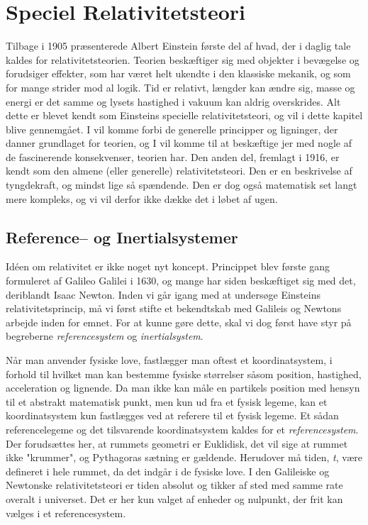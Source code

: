 \chapter{Speciel Relativitetsteori}

Tilbage i 1905 præsenterede Albert Einstein første del af hvad, der i daglig tale kaldes for relativitetsteorien. Teorien beskæftiger sig med objekter i bevægelse og forudsiger effekter, som har været helt ukendte i den klassiske mekanik, og som for mange strider mod al logik. Tid er relativt, længder kan ændre sig, masse og energi er det samme og lysets hastighed i vakuum kan aldrig overskrides. Alt dette er blevet kendt som Einsteins specielle relativitetsteori, og vil i dette kapitel blive gennemgået. I vil komme forbi de generelle principper og ligninger, der danner grundlaget for teorien, og I vil komme til at beskæftige jer med nogle af de fascinerende konsekvenser, teorien har. Den anden del, fremlagt i 1916, er kendt som den almene (eller generelle) relativitetsteori. Den er en beskrivelse af tyngdekraft, og mindst lige så spændende. Den er dog også matematisk set langt mere kompleks, og vi vil derfor ikke dække det i løbet af ugen.

\section{Reference-- og Inertialsystemer}

Idéen om relativitet er ikke noget nyt koncept. Princippet blev første gang formuleret af Galileo Galilei i 1630, og mange har siden beskæftiget sig med det, deriblandt Isaac Newton. Inden vi går igang med at undersøge Einsteins relativitetsprincip, må vi først stifte et bekendtskab med Galileis og Newtons arbejde inden for emnet. For at kunne gøre dette, skal vi dog først have styr på begreberne \textit{referencesystem} og \textit{inertialsystem}.

Når man anvender fysiske love, fastlægger man oftest et koordinatsystem, i forhold til hvilket man kan bestemme fysiske størrelser såsom position, hastighed, acceleration og lignende. Da man ikke kan måle en partikels position med hensyn til et abstrakt matematisk punkt, men kun ud fra et fysisk legeme, kan et koordinatsystem kun fastlægges ved at referere til et fysisk legeme. Et sådan  referencelegeme og det tilsvarende koordinatsystem kaldes for et \textit{referencesystem}. Der forudsættes her, at rummets geometri er Euklidisk, det vil sige at rummet ikke "krummer", og Pythagoras sætning er gældende. Herudover må tiden, \textit{t}, være defineret i hele rummet, da det indgår i de fysiske love. I den Galileiske og Newtonske relativitetsteori er tiden absolut og tikker af sted med samme rate overalt i universet. Det er her kun valget af enheder og nulpunkt, der frit kan vælges i et referencesystem. 

